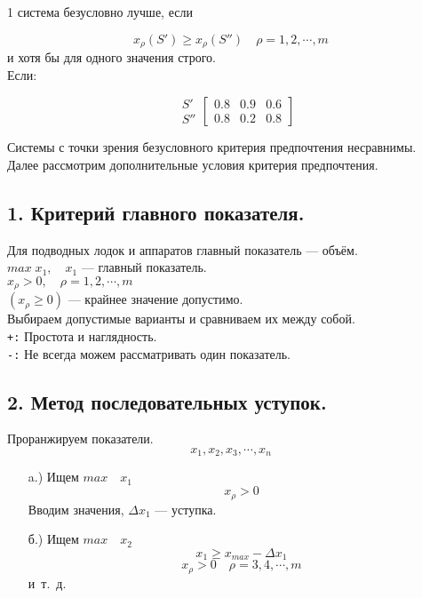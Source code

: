 \documentclass[12pt,a5paper]{scrbook}
\begin{document}
  1 система безусловно лучше, если 
  
  \[ 
    x_{\rho}(S') \geq x_{\rho}(S'')\quad\rho=1,2,\cdots,m 
  \]
  и хотя бы для одного значения строго.\\
  Если:
  
  \[
    \begin{aligned}
      &S'\\
      &S''
    \end{aligned}
    \begin{bmatrix}
      0.8 & 0.9 & 0.6\\
      0.8 & 0.2 & 0.8
    \end{bmatrix}
  \]
  
  Системы с точки зрения безусловного критерия предпочтения несравнимы.\\
  
  Далее рассмотрим дополнительные условия критерия предпочтения.
  
  \subsection*{1. Критерий главного показателя.}
  Для подводных лодок и аппаратов главный показатель --- объём.\\
  $max\;x_1,\quad x_1$ --- главный показатель.\\
  $x_{\rho} > 0,\quad \rho=1,2,\cdots,m$\\
  $(x_{\rho} \geq 0)$ --- крайнее значение допустимо.\\
  
  Выбираем допустимые варианты и сравниваем их между собой.\\
  \texttt{+:} Простота и наглядность.\\
  \texttt{-:} Не всегда можем рассматривать один показатель.
  
  \subsection*{2. Метод последовательных уступок.}
  Проранжируем показатели.
  \[
    x_1,x_2,x_3,\cdots,x_n
  \]
  \begin{itemize}
    \item[a.)] Ищем $max \quad x_1$
    $$x_{\rho} > 0$$
    Вводим значения, $\Delta x_1$ --- уступка.
    \item[б.)] Ищем $max \quad x_2$
    $$x_1 \geq x_{max} - \Delta x_1$$
    $$x_{\rho} > 0 \quad \rho=3,4,\cdots,m$$
    и~т.~д.
  \end{itemize}
  
\end{document}
